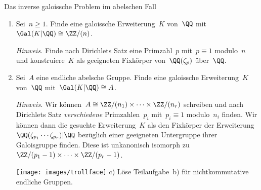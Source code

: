 \documentclass{uebblatt}
\begin{document}

\begin{aufgabe}{Das inverse galoissche Problem im abelschen Fall}
\begin{enumerate}
\item Sei~$n \geq 1$. Finde eine galoissche Erweiterung~$K$ von~$\QQ$
mit~$\Gal(K|\QQ) \cong \ZZ/(n)$.

{\tiny\emph{Hinweis.} Finde nach Dirichlets Satz eine Primzahl~$p$ mit~$p
\equiv 1$ modulo~$n$ und konstruiere~$K$ als geeigneten Fixkörper
von~$\QQ(\zeta_p)$ über~$\QQ$.\par}

\item Sei~$A$ eine endliche abelsche Gruppe. Finde eine galoissche Erweiterung~$K$
von~$\QQ$ mit~$\Gal(K|\QQ) \cong A$.

{\tiny\emph{Hinweis.} Wir können~$A \cong \ZZ/(n_1) \times \cdots \times
\ZZ/(n_r)$ schreiben und nach Dirichlets Satz \emph{verschiedene}
Primzahlen~$p_i$ mit~$p_i \equiv 1$ modulo~$n_i$ finden. Wir können dann die
gesuchte Erweiterung~$K$ als den Fixkörper
der Erweiterung~$\QQ(\zeta_{p_1}\cdots\zeta_{p_r})|\QQ$ bezüglich einer geeigneten Untergruppe
ihrer Galoisgruppe finden. Diese ist unkanonisch isomorph zu~$\ZZ/(p_1-1)
\times \cdots \times \ZZ/(p_r-1)$.\par}

\item[{\texttt{[image: images/trollface]} c)}]
Löse Teilaufgabe~b) für nichtkommutative endliche Gruppen.
\end{enumerate}
\end{aufgabe}
\end{document}
